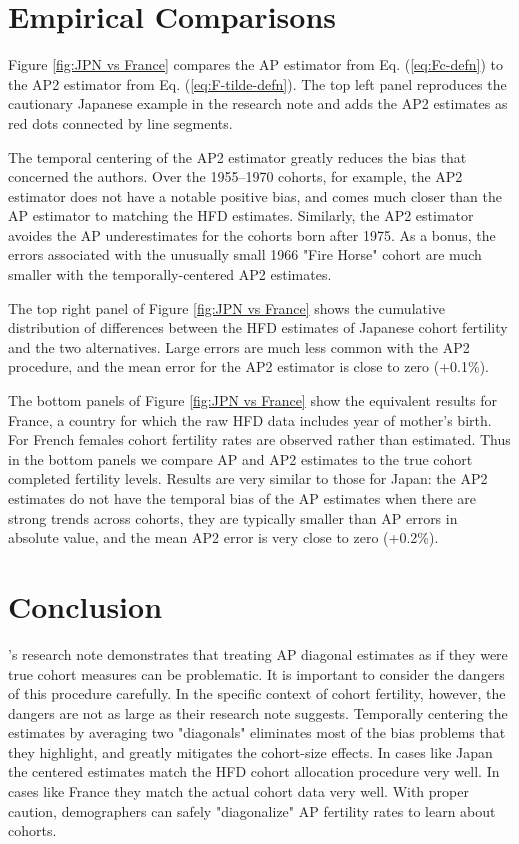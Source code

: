 \documentclass[12pt,letterpaper]{article}
\begin{document}
\section{Empirical Comparisons}

Figure \ref{fig:JPN vs France} compares the AP estimator from Eq. (\ref{eq:Fc-defn}) to the AP2 estimator from Eq. (\ref{eq:F-tilde-defn}). The top left panel reproduces the cautionary Japanese example in the research note \cite[Fig. 2]{van_raalte_dangers_2023} and adds the AP2 estimates as red dots connected by line segments. 

The temporal centering of the AP2 estimator greatly reduces the bias that concerned the authors. Over the 1955--1970 cohorts, for example, the AP2 estimator does not have a notable positive bias, and comes much closer than the AP estimator to matching the HFD estimates. Similarly, the AP2 estimator avoides the AP underestimates for the cohorts born after 1975. As a bonus, the errors associated with the unusually small 1966 "Fire Horse" cohort are much smaller with the temporally-centered AP2 estimates. 

The top right panel of Figure \ref{fig:JPN vs France} shows the cumulative distribution of differences between the HFD estimates of Japanese cohort fertility and the two alternatives. Large errors are much less common with the AP2 procedure, and the mean error for the AP2 estimator is close to zero (+0.1\%). 

The bottom panels of Figure \ref{fig:JPN vs France} show the equivalent results for France, a country for which the raw HFD data includes year of mother's birth. For French females cohort fertility rates are observed rather than estimated. Thus in the bottom panels we compare AP and AP2 estimates to the true cohort completed fertility levels. Results are very similar to those for Japan: the AP2 estimates do not have the temporal bias of the AP estimates when there are strong trends across cohorts, they are typically smaller than AP errors in absolute value, and the mean AP2 error is very close to zero (+0.2\%). 


\section{Conclusion}

\cite{van_raalte_dangers_2023}'s research note demonstrates that treating AP diagonal estimates as if they were true cohort measures can be problematic. It is important to consider the dangers of this procedure carefully. In the specific context of cohort fertility, however, the dangers are not as large as their research note suggests. Temporally centering the estimates by averaging two "diagonals" eliminates most of the bias problems that they highlight, and greatly mitigates the cohort-size effects. In cases like Japan the centered estimates match the HFD cohort allocation procedure very well. In cases like France they match the actual cohort data very well. With proper caution, demographers can safely "diagonalize" AP fertility rates to learn about cohorts.
\end{document}
